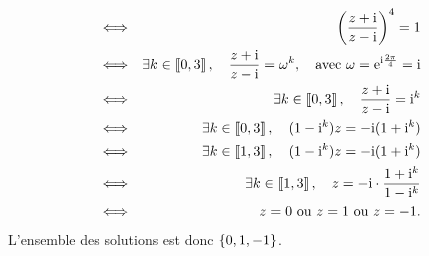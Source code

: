 \documentclass{magnolia}
\begin{document}
\begin{sol}
\begin{questions}
\begin{eqnarray*}
  &\Longleftrightarrow& \left(\frac{z+{\rm i}}{z-{\rm i}}\right)^4=1\\
  &\Longleftrightarrow& \exists k\in\left\llbracket 0,3\right\rrbracket,\quad \frac{z+{\rm i}}{z-{\rm i}}=\omega^k, \quad\text{avec $\omega={\rm e}^{{\rm i}\frac{2\pi}{4}}={\rm i}$}\\
  &\Longleftrightarrow& \exists k\in\left\llbracket 0,3\right\rrbracket,\quad \frac{z+{\rm i}}{z-{\rm i}}={\rm i}^k\\
  &\Longleftrightarrow& \exists k\in\left\llbracket 0,3\right\rrbracket,\quad (1-{\rm i}^k)z=-{\rm i}(1+{\rm i}^k)\\
  &\Longleftrightarrow& \exists k\in\left\llbracket 1,3\right\rrbracket,\quad (1-{\rm i}^k)z=-{\rm i}(1+{\rm i}^k)\\
  &\Longleftrightarrow& \exists k\in\left\llbracket 1,3\right\rrbracket,\quad z=-{\rm i}\cdot\frac{1+{\rm i}^k}{1-{\rm i}^k}\\
  &\Longleftrightarrow& \text{$z=0$ ou $z=1$ ou $z=-1$}.
  \end{eqnarray*}
  L'ensemble des solutions est donc $\left\{0,1,-1\right\}$.
\end{questions} 
\end{sol}
\end{document}
